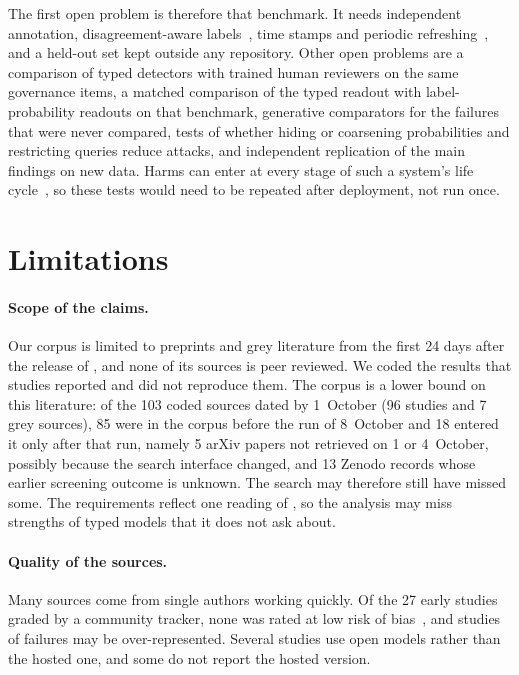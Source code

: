 The first open problem is therefore that benchmark.
It needs independent annotation, disagreement-aware labels~\cite{davani2022dealing}, time stamps and periodic refreshing~\cite{dibonaventura2025hatevolution}, and a held-out set kept outside any repository.
Other open problems are a comparison of typed detectors with trained human reviewers on the same governance items, a matched comparison of the typed readout with label-probability readouts on that benchmark, generative comparators for the failures that were never compared, tests of whether hiding or coarsening probabilities and restricting queries reduce attacks, and independent replication of the main findings on new data.
Harms can enter at every stage of such a system's life cycle~\cite{suresh2021framework}, so these tests would need to be repeated after deployment, not run once.

\section{Limitations}
\label{sec:limitations}

\paragraph{Scope of the claims.}
Our corpus is limited to preprints and grey literature from the first 24 days after the release of \jev{}, and none of its sources is peer reviewed.
We coded the results that studies reported and did not reproduce them.
The corpus is a lower bound on this literature: of the 103 coded sources dated by 1~October (96 studies and 7 grey sources), 85 were in the corpus before the run of 8~October and 18 entered it only after that run, namely 5 arXiv papers not retrieved on 1 or 4~October, possibly because the search interface changed, and 13 Zenodo records whose earlier screening outcome is unknown. The search may therefore still have missed some.
The requirements reflect one reading of \pol{}, so the analysis may miss strengths of typed models that it does not ask about.

\paragraph{Quality of the sources.}
Many sources come from single authors working quickly.
Of the 27 early studies graded by a community tracker, none was rated at low risk of bias~\cite{rafe2026awesome}, and studies of failures may be over-represented.
Several studies use open models rather than the hosted one, and some do not report the hosted version.

